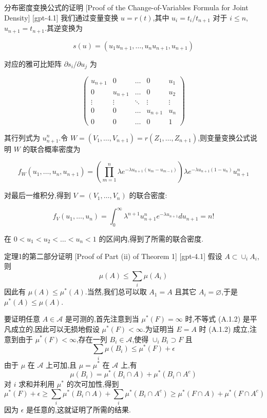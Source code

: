 \documentclass[UTF8]{ctexart}
\begin{document}
    \begin{prf}
        {分布密度变换公式的证明}
        [Proof of the Change-of-Variables Formula for Joint Density]
        [gpt-4.1]
        我们通过变量变换 $
u = r(t)$,其中 $
u_i = t_i / t_{n+1}$ 对于 $i \leq n$,$
u_{n+1} = t_{n+1}$.其逆变换为

\[
s(
u) = (
u_1 
u_{n+1}, \ldots, 
u_n 
u_{n+1}, 
u_{n+1})
\]

对应的雅可比矩阵 $\partial s_i / \partial 
u_j$ 为

\[
\left(
\begin{array}{ccccc}

u_{n+1} & 0 & \ldots & 0 & 
u_1 \\
0 & 
u_{n+1} & \ldots & 0 & 
u_2 \\
\vdots & \vdots & \ddots & \vdots & \vdots \\
0 & 0 & \ldots & 
u_{n+1} & 
u_n \\
0 & 0 & \ldots & 0 & 1
\end{array}
\right)
\]

其行列式为 $
u_{n+1}^n$.令 $W = (V_1, \ldots, V_{n+1}) = r(Z_1, \ldots, Z_{n+1})$,则变量变换公式说明 $W$ 的联合概率密度为

\[
f_W(
u_1, \ldots, 
u_n, 
u_{n+1}) = \left( \prod_{m=1}^n \lambda e^{-\lambda 
u_{n+1} (
u_m - 
u_{m-1})} \right) \lambda e^{-\lambda 
u_{n+1} (1 - 
u_n)} 
u_{n+1}^n
\]

对最后一维积分,得到 $V = (V_1, \ldots, V_n)$ 的联合密度:

\[
f_V(
u_1, \ldots, 
u_n) = \int_0^{\infty} \lambda^{n+1} 
u_{n+1}^n e^{-\lambda 
u_{n+1}} d
u_{n+1} = n!
\]

在 $0 < 
u_1 < 
u_2 < \ldots < 
u_n < 1$ 的区间内,得到了所需的联合密度.

    \end{prf}
    
    
    
    \begin{prf}
        {定理1的第二部分证明}
        [Proof of Part (ii) of Theorem 1]
        [gpt-4.1]
        假设 $A \subset \cup_{i} A_{i}$,则
\[
\mu(A) \leq \sum_{i} \mu(A_{i})
\]
因此有 $\mu(A) \leq \mu^*(A)$.当然,我们总可以取 $A_1 = A$ 且其它 $A_i = \varnothing$,于是 $\mu^*(A) \leq \mu(A)$.

要证明任意 $A \in \mathcal{A}$ 是可测的,首先注意到当 $\mu^*(F) = \infty$ 时,不等式 (A.1.2) 是平凡成立的,因此可以无损地假设 $\mu^*(F) < \infty$.为证明当 $E = A$ 时 (A.1.2) 成立,注意到由于 $\mu^*(F) < \infty$,存在一列 $B_i \in \mathcal{A}$,使得 $\cup_i B_i \supset F$ 且
\[
\sum_{i} \mu(B_{i}) \leq \mu^*(F) + \epsilon
\]
由于 $\mu$ 在 $\mathcal{A}$ 上可加,且 $\mu = \mu^*$ 在 $\mathcal{A}$ 上,有
\[
\mu(B_{i}) = \mu^*(B_{i} \cap A) + \mu^*(B_{i} \cap A^{c})
\]
对 $i$ 求和并利用 $\mu^*$ 的次可加性,得到
\[
\mu^*(F) + \epsilon \geq \sum_{i} \mu^*(B_{i} \cap A) + \sum_{i} \mu^*(B_{i} \cap A^{c}) \geq \mu^*(F \cap A) + \mu^*(F \cap A^{c})
\]
因为 $\epsilon$ 是任意的,这就证明了所需的结果.

    \end{prf}
    
\end{document}
